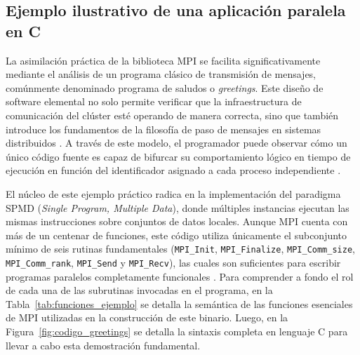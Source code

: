 \subsection{Ejemplo ilustrativo de una aplicación paralela en C}

La asimilación práctica de la biblioteca MPI se facilita significativamente mediante el análisis de un programa clásico de transmisión de mensajes, comúnmente denominado programa de saludos o \textit{greetings}. Este diseño de software elemental no solo permite verificar que la infraestructura de comunicación del clúster esté operando de manera correcta, sino que también introduce los fundamentos de la filosofía de paso de mensajes en sistemas distribuidos \cite{pacheco_2011}. A través de este modelo, el programador puede observar cómo un único código fuente es capaz de bifurcar su comportamiento lógico en tiempo de ejecución en función del identificador asignado a cada proceso independiente \cite{gropp_using_mpi_1999}.

El núcleo de este ejemplo práctico radica en la implementación del paradigma SPMD (\textit{Single Program, Multiple Data}), donde múltiples instancias ejecutan las mismas instrucciones sobre conjuntos de datos locales. Aunque MPI cuenta con más de un centenar de funciones, este código utiliza únicamente el subconjunto mínimo de seis rutinas fundamentales (\texttt{MPI\_Init}, \texttt{MPI\_Finalize}, \texttt{MPI\_Comm\_size}, \texttt{MPI\_Comm\_rank}, \texttt{MPI\_Send} y \texttt{MPI\_Recv}), las cuales son suficientes para escribir programas paralelos completamente funcionales \cite{grama_intro_parallel_2003, gropp_using_mpi_1999}. Para comprender a fondo el rol de cada una de las subrutinas invocadas en el programa, en la Tabla~\ref{tab:funciones_ejemplo} se detalla la semántica de las funciones esenciales de MPI utilizadas en la construcción de este binario. Luego, en la Figura~\ref{fig:codigo_greetings} se detalla la sintaxis completa en lenguaje C para llevar a cabo esta demostración fundamental.

